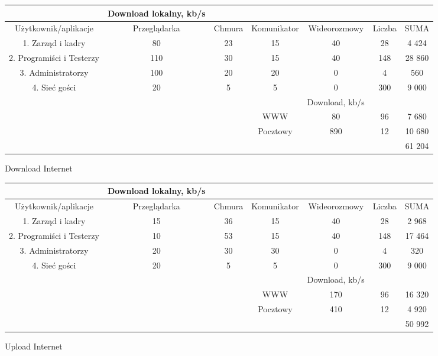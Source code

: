 \documentclass{article}
\begin{document}
\begin{Tabela}[!ht]
	\centering
	\begin{tabular}{|c|c|c|c|c|c|c} \hline
		& Download lokalny, kb/s \\
		\hline
		Użytkownik/aplikacje & Przeglądarka& Chmura & Komunikator & Wideorozmowy & Liczba &SUMA\\
		\hline
		1. Zarząd i kadry  & 80 & 23 & 15 & 40 & 28 & 4 424\\
		2. Programiści i Testerzy & 110 & 30 & 15 & 40 & 148 & 28 860\\
		3. Administratorzy & 100 & 20 & 20 & 0 & 4 & 560\\
		4. Sieć gości & 20 & 5 & 5 & 0 & 300 & 9 000\\
		\hline
		\hline
		&&&&Download, kb/s && \\
		\hline
		&&& WWW & 80 & 96 & 7 680\\
		&&& Pocztowy & 890 & 12 & 10 680\\
		&&&&&&61 204\\
		\hline
	\end{tabular}
	\caption{Download Internet}
\end{Tabela}
\begin{Tabela}[!ht]
	\centering
	\begin{tabular}{|c|c|c|c|c|c|c} \hline
		& Download lokalny, kb/s \\
		\hline
		Użytkownik/aplikacje & Przeglądarka& Chmura & Komunikator & Wideorozmowy & Liczba &SUMA\\
		\hline
		1. Zarząd i kadry  & 15 & 36 & 15 & 40 & 28 & 2 968\\
		2. Programiści i Testerzy & 10 & 53 & 15 & 40 & 148 & 17 464\\
		3. Administratorzy & 20 & 30 & 30 & 0 & 4 & 320\\
		4. Sieć gości & 20 & 5 & 5 & 0 & 300 & 9 000\\
		\hline
		\hline
		&&&&Download, kb/s && \\
		\hline
		&&& WWW & 170 & 96 & 16 320\\
		&&& Pocztowy &410 & 12 & 4 920\\
		&&&&&&50 992\\
		\hline
	\end{tabular}
	\caption{Upload Internet}
\end{Tabela}
\newpage
\end{document}
